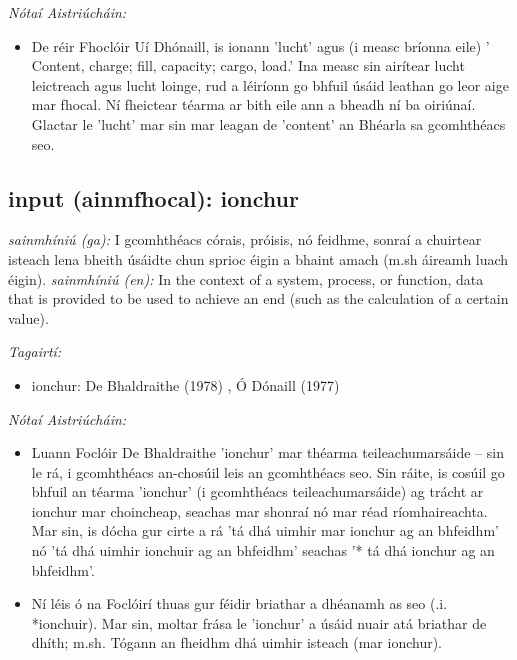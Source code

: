 \documentclass{article}
\begin{document}
 \noindent \textit{Nótaí Aistriúcháin:}
\begin{itemize}
	\item De réir Fhoclóir Uí Dhónaill, is ionann 'lucht' agus (i measc bríonna eile) ' Content, charge; fill, capacity; cargo, load.' Ina measc sin airítear lucht leictreach agus lucht loinge, rud a léiríonn go bhfuil úsáid leathan go leor aige mar fhocal. Ní fheictear téarma ar bith eile ann a bheadh ní ba oiriúnaí. Glactar le 'lucht' mar sin mar leagan de 'content' an Bhéarla sa gcomhthéacs seo.
\end{itemize}


\subsection*{input (ainmfhocal): ionchur} 
 \noindent \textit{sainmhíniú (ga):} I gcomhthéacs córais, próisis, nó feidhme, sonraí a chuirtear isteach lena bheith úsáidte chun sprioc éigin a bhaint amach (m.sh áireamh luach éigin).
\newline\newline
 \noindent \textit{sainmhíniú (en):} In the context of a system, process, or function, data that is provided to be used to achieve an end (such as the calculation of a certain value).
\newline

 \noindent \textit{Tagairtí:}
\begin{itemize}
	\item ionchur: De Bhaldraithe (1978) \cite{de-bhaldraithe}, Ó Dónaill (1977) \cite{odonaill}
\end{itemize}

 \noindent \textit{Nótaí Aistriúcháin:}
\begin{itemize}
	\item Luann Foclóir De Bhaldraithe 'ionchur' mar théarma teileachumarsáide -- sin le rá, i gcomhthéacs an-chosúil leis an gcomhthéacs seo. Sin ráite, is cosúil go bhfuil an téarma 'ionchur' (i gcomhthéacs teileachumarsáide) ag trácht ar ionchur mar choincheap, seachas mar shonraí nó mar réad ríomhaireachta. Mar sin, is dócha gur cirte a rá 'tá dhá uimhir mar ionchur ag an bhfeidhm' nó 'tá dhá uimhir ionchuir ag an bhfeidhm' seachas '* tá dhá ionchur ag an bhfeidhm'.
	\item Ní léis ó na Foclóirí thuas gur féidir briathar a dhéanamh as seo (.i. *ionchuir). Mar sin, moltar frása le 'ionchur' a úsáid nuair atá briathar de dhíth; m.sh. Tógann an fheidhm dhá uimhir isteach (mar ionchur).
\end{itemize}
\end{document}
